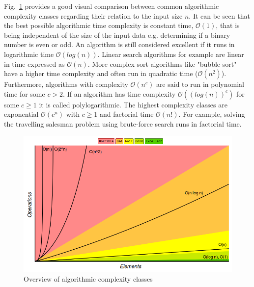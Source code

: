 Fig.~\ref{fig:algcomplexities} provides a good visual comparison between common algorithmic complexity classes regarding their relation to the input size $n$. It can be seen that the best possible algorithmic time complexity is constant time, $\mathcal{O}(1)$, that is being independent of the size of the input data e.g. determining if a binary number is even or odd. An algorithm is still considered excellent if it runs in logarithmic time $\mathcal{O}(log(n))$. Linear search algorithms for example are linear in time expressed as $\mathcal{O}(n)$. More complex sort algorithms like "bubble sort" have a higher time complexity and often run in quadratic time ($\mathcal{O}(n^2)$). Furthermore, algorithms with complexity $\mathcal{O}(n^c)$ are said to run in polynomial time for some $c > 2$. If an algorithm has time complexity $\mathcal{O}((log(n))^c)$ for some $c \geq 1$ it is called polylogarithmic. The highest complexity classes are exponential $\mathcal{O}(c^n)$ with $c \geq 1$ and factorial time $\mathcal{O}(n!)$. For example, solving the travelling salesman problem using brute-force search runs in factorial time.

\begin{figure}[H]
      \centering
       \includegraphics[scale=0.25]{img/bigocomplexity.png}
       \caption[]{\label{fig:algcomplexities} Overview of algorithmic complexity classes\footnotemark[6]}
\end{figure}

